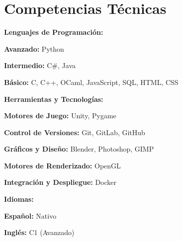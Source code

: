 \section{Competencias Técnicas}

\begin{onecolentry}
    \textbf{Lenguajes de Programación:}
    \begin{highlights}
        \item \textbf{Avanzado:} Python
        \item \textbf{Intermedio:} C\#, Java
        \item \textbf{Básico:} C, C++, OCaml, JavaScript, SQL, HTML, CSS
    \end{highlights}
 \end{onecolentry}
    
 \vspace{0.2 cm}
    
\begin{onecolentry}
    \textbf{Herramientas y Tecnologías:} 
    \begin{highlights}
        \item \textbf{Motores de Juego:} Unity, Pygame
        \item \textbf{Control de Versiones:} Git, GitLab, GitHub
        \item \textbf{Gráficos y Diseño:} Blender, Photoshop, GIMP
        \item \textbf{Motores de Renderizado:} OpenGL
        \item \textbf{Integración y Despliegue:} Docker
    \end{highlights}
\end{onecolentry}

\vspace{0.2 cm}

\begin{onecolentry}
    \textbf{Idiomas:}
    \begin{highlights}
        \item \textbf{Español:} Nativo
        \item \textbf{Inglés:} C1 (Avanzado)
    \end{highlights}
 \end{onecolentry}